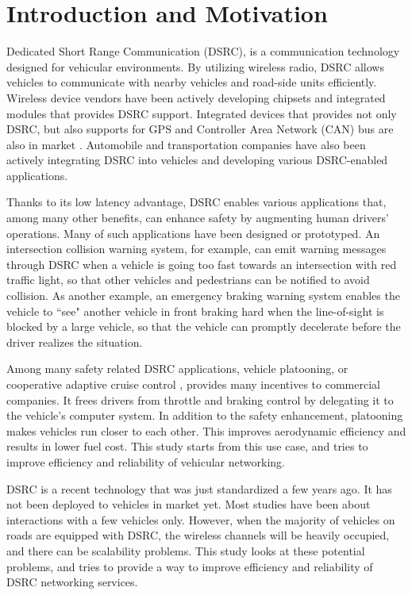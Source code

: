 \documentclass[12pt]{report}
\begin{document}
\normalem       %

\chapter{Introduction and Motivation}
Dedicated Short Range Communication (DSRC), is a communication technology designed for vehicular environments. By utilizing wireless radio, DSRC allows vehicles to communicate with nearby vehicles and road-side units efficiently. Wireless device vendors have been actively developing chipsets and integrated modules that provides DSRC support. Integrated devices that provides not only DSRC, but also supports for GPS and Controller Area Network (CAN) bus are also in market \cite{aradasystems,denso,unex}. Automobile and transportation companies have also been actively integrating DSRC into vehicles and developing various DSRC-enabled applications.

Thanks to its low latency advantage, DSRC enables various applications that, among many other benefits, can enhance safety by augmenting human drivers' operations. Many of such applications have been designed or prototyped. An intersection collision warning system, for example, can emit warning messages through DSRC when a vehicle is going too fast towards an intersection with red traffic light, so that other vehicles and pedestrians can be notified to avoid collision. As another example, an emergency braking warning system enables the vehicle to ``see" another vehicle in front braking hard when the line-of-sight is blocked by a large vehicle, so that the vehicle can promptly decelerate before the driver realizes the situation.

Among many safety related DSRC applications, vehicle platooning, or cooperative adaptive cruise control \cite{fhwa2015report}, provides many incentives to commercial companies. It frees drivers from throttle and braking control by delegating it to the vehicle's computer system. In addition to the safety enhancement, platooning makes vehicles run closer to each other. This improves aerodynamic efficiency and results in lower fuel cost. This study starts from this use case, and tries to improve efficiency and reliability of vehicular networking.

DSRC is a recent technology that was just standardized a few years ago. It has not been deployed to vehicles in market yet. Most studies have been about interactions with a few vehicles only. However, when the majority of vehicles on roads are equipped with DSRC, the wireless channels will be heavily occupied, and there can be scalability problems. This study looks at these potential problems, and tries to provide a way to improve efficiency and reliability of DSRC networking services.
\end{document}
